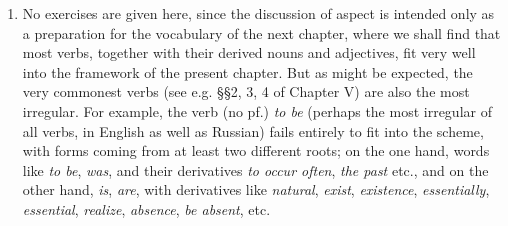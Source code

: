 \begin{enumerate}[label=\arabic*)]
\item No exercises are given here, since the discussion of aspect is intended only as a preparation for the vocabulary of the next chapter, where we shall find that most verbs, together with their derived nouns and adjectives, fit very well into the framework of the present chapter. But as might be expected, the very commonest verbs (see e.g. §§2, 3, 4 of Chapter V) are also the most irregular. For example, the verb  (no pf.) \emph{to be} (perhaps the most irregular of all verbs, in English as well as Russian) fails entirely to fit into the scheme, with forms coming from at least two different roots; on the one hand, words like  \emph{to be},  \emph{was}, and their derivatives  \emph{to occur often},  \emph{the past} etc., and on the other hand,  \emph{is},  \emph{are}, with derivatives like  \emph{natural},  \emph{exist},  \emph{existence},  \emph{essentially},  \emph{essential},  \emph{realize},  \emph{absence},  \emph{be absent}, etc.
\end{enumerate}

\fussy
